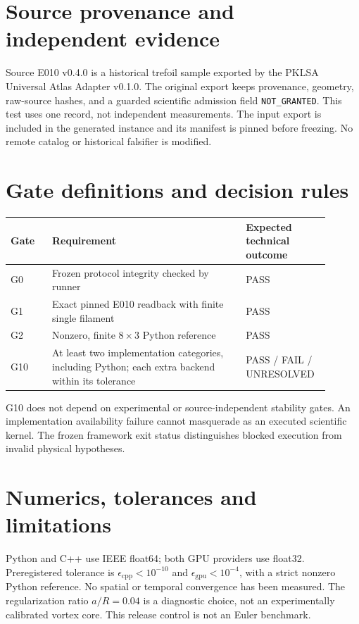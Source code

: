 \documentclass[11pt,a4paper]{article}
\begin{document}
\section{Source provenance and independent evidence}
Source E010 v0.4.0 is a historical trefoil sample exported by the PKLSA Universal Atlas Adapter v0.1.0. The original export keeps provenance, geometry, raw-source hashes, and a guarded scientific admission field \texttt{NOT\_GRANTED}. This test uses one record, not independent measurements. The input export is included in the generated instance and its manifest is pinned before freezing. No remote catalog or historical falsifier is modified.
\section{Gate definitions and decision rules}
\begin{longtable}{p{0.12\linewidth}p{0.57\linewidth}p{0.21\linewidth}}\toprule
Gate & Requirement & Expected technical outcome \\ \midrule
G0 & Frozen protocol integrity checked by runner & PASS \\
G1 & Exact pinned E010 readback with finite single filament & PASS \\
G2 & Nonzero, finite $8\times3$ Python reference & PASS \\
G10 & At least two implementation categories, including Python; each extra backend within its tolerance & PASS / FAIL / UNRESOLVED \\ \bottomrule\end{longtable}
G10 does not depend on experimental or source-independent stability gates. An implementation availability failure cannot masquerade as an executed scientific kernel. The frozen framework exit status distinguishes blocked execution from invalid physical hypotheses.
\section{Numerics, tolerances and limitations}
Python and C++ use IEEE float64; both GPU providers use float32. Preregistered tolerance is $\epsilon_{\mathrm{cpp}}<10^{-10}$ and $\epsilon_{\mathrm{gpu}}<10^{-4}$, with a strict nonzero Python reference. No spatial or temporal convergence has been measured. The regularization ratio $a/R=0.04$ is a diagnostic choice, not an experimentally calibrated vortex core. This release control is not an Euler benchmark.
\end{document}
